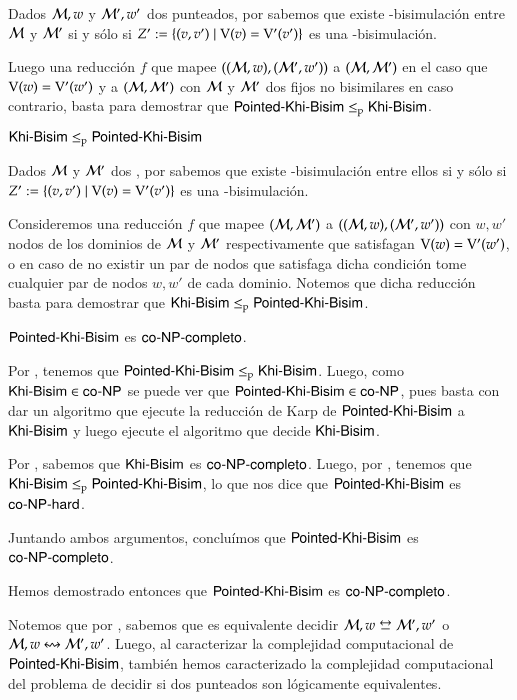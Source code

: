 \begin{demostracion}
    Dados $\mathcal{M},w$ y $\mathcal{M}',w'$ dos \ultss punteados, por  sabemos que existe 
    \KHilogic-bisimulación entre $\mathcal{M}$ y $\mathcal{M}'$ si y sólo si $Z' := \{(v,v') \mid \mathrm{V}(v) = \mathrm{V}'(v')\}$ es una \KHilogic-bisimulación. 
    
    Luego una reducción $f$ que mapee $((\mathcal{M},w),(\mathcal{M}',w'))$ a $(\mathcal{M},\mathcal{M}')$ en el caso que $\mathrm{V}(w) = \mathrm{V}'(w')$ 
    y a $(\mathcal{M},\mathcal{M}')$ con $\mathcal{M}$ y $\mathcal{M}'$ dos \ultss fijos no bisimilares en caso contrario, basta 
    para demostrar que $\rm\textsf{Pointed-Khi-Bisim} \leq_p \rm\textsf{Khi-Bisim}$.
\end{demostracion}

\begin{lema}\label{lema:general-to-pointed}
    $\rm\textsf{Khi-Bisim} \leq_p \rm\textsf{Pointed-Khi-Bisim}$
\end{lema}

\begin{demostracion}
    Dados $\mathcal{M}$ y $\mathcal{M}'$ dos \ultss, por  sabemos que existe 
    \KHilogic-bisimulación entre ellos si y sólo si $Z' := \{(v,v') \mid \mathrm{V}(v) = \mathrm{V}'(v')\}$ es una \KHilogic-bisimulación.

    Consideremos una reducción $f$ que mapee $(\mathcal{M},\mathcal{M}')$ a $((\mathcal{M},w),(\mathcal{M}',w'))$ con $w,w'$ nodos de los dominios de $\mathcal{M}$ 
    y $\mathcal{M}'$ respectivamente que satisfagan $\mathrm{V}(w) = \mathrm{V}'(w')$, o en caso de no existir un par de nodos que satisfaga dicha condición tome cualquier 
    par de nodos $w,w'$ de cada dominio. Notemos que dicha reducción basta para demostrar que $\rm\textsf{Khi-Bisim} \leq_p \rm\textsf{Pointed-Khi-Bisim}$.
\end{demostracion}

\begin{teorema}
    $\rm\textsf{Pointed-Khi-Bisim}$ es $\rm\textsf{co-NP-completo}$.
\end{teorema}

\begin{demostracion}
    Por , tenemos que $\rm\textsf{Pointed-Khi-Bisim} \leq_p \rm\textsf{Khi-Bisim}$. Luego, como $\rm\textsf{Khi-Bisim} \in \rm\textsf{co-NP}$ se puede ver que 
    $\rm\textsf{Pointed-Khi-Bisim} \in \rm\textsf{co-NP}$, pues basta con dar un algoritmo que ejecute la reducción de Karp de $\rm\textsf{Pointed-Khi-Bisim}$ a $\rm\textsf{Khi-Bisim}$ y luego ejecute 
    el algoritmo que decide $\rm\textsf{Khi-Bisim}$.


    Por , sabemos que $\rm\textsf{Khi-Bisim}$ es $\rm\textsf{co-NP-completo}$. Luego, por , tenemos que 
    $\rm\textsf{Khi-Bisim} \leq_p \rm\textsf{Pointed-Khi-Bisim}$, lo que nos dice que $\rm\textsf{Pointed-Khi-Bisim}$ es $\rm\textsf{co-NP-hard}$.
    
    Juntando ambos argumentos, concluímos que $\rm\textsf{Pointed-Khi-Bisim}$ es $\rm\textsf{co-NP-completo}$.
\end{demostracion}


Hemos demostrado entonces que $\rm\textsf{Pointed-Khi-Bisim}$ es $\rm\textsf{co-NP-completo}$.

Notemos que por , sabemos que es equivalente decidir $\modults,w \bisim \modults',w'$ o 
$\mathcal{M},w \mathrel{\leftrightsquigarrow} \mathcal{M}',w'$. Luego, al caracterizar la complejidad computacional de $\rm\textsf{Pointed-Khi-Bisim}$, también hemos caracterizado 
la complejidad computacional del problema de decidir si dos \ultss punteados son lógicamente equivalentes.

